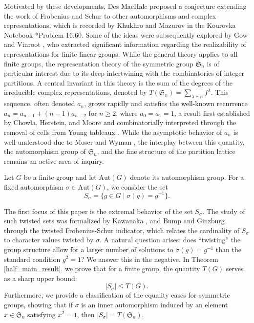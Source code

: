 \documentclass[oneside]{amsart}
\theoremstyle{plain}
\theoremstyle{definition}
\theoremstyle{remark}
\begin{document}
    Motivated by these developments, Des MacHale proposed a conjecture extending the work of Frobenius and Schur to other automorphisms and complex representations, which is recorded by Khukhro and Mazurov in the Kourovka Notebook \cite{MR4842130}*{Problem 16.60}. Some of the ideas were subsequently explored by Gow \cite{MR716800, MR808851} and Vinroot \cite{MR2173976}, who extracted significant information regarding the realizability of representations for finite linear groups. While the general theory applies to all finite groups, the representation theory of the symmetric group $\mathfrak{S}_n$ is of particular interest due to its deep intertwining with the combinatorics of integer partitions. A central invariant in this theory is the sum of the degrees of the irreducible complex representations, denoted by $T(\mathfrak{S}_n) = \sum_{\lambda \vdash n} f^\lambda$. This sequence, often denoted $a_n$, grows rapidly and satisfies the well-known recurrence $a_n = a_{n - 1} + (n - 1)a_{n - 2}$ for $n \geq 2$, where $a_0 = a_1 = 1$, a result first established by Chowla, Herstein, and Moore \cite{MR41849} and combinatorially interpreted through the removal of cells from Young tableaux \cite{MR1153249}. While the asymptotic behavior of $a_n$ is well-understood due to Moser and Wyman \cite{MR68564}, the interplay between this quantity, the automorphism group of $\mathfrak{S}_n$, and the fine structure of the partition lattice remains an active area of inquiry.

    Let $G$ be a finite group and let $\mathrm{Aut}(G)$ denote its automorphism group. For a fixed automorphism $\sigma \in \mathrm{Aut}(G)$, we consider the set
    \begin{equation}
        S_{\sigma} = \{g \in G \mid \sigma(g) = g^{-1}\}.
    \end{equation}
    
    The first focus of this paper is the extremal behavior of the set $S_\sigma$. The study of such twisted sets was formalized by Kawanaka \cite{MR1078564}, and Bump and Ginzburg \cite{MR2068079} through the twisted Frobenius-Schur indicator, which relates the cardinality of $S_\sigma$ to character values twisted by $\sigma$. A natural question arises: does ``twisting'' the group structure allow for a larger number of solutions to $\sigma(g) = g^{-1}$ than the standard condition $g^2 = 1$? We answer this in the negative. In Theorem \ref{half_main_result}, we prove that for a finite group, the quantity $T(G)$ serves as a sharp upper bound:
    \[ |S_\sigma| \le T(G). \]
    Furthermore, we provide a classification of the equality cases for symmetric groups, showing that if $\sigma$ is an inner automorphism induced by an element $x \in \mathfrak{S}_n$ satisfying $x^2=1$, then $|S_\sigma| = T(\mathfrak{S}_n)$. 
    
\end{document}
